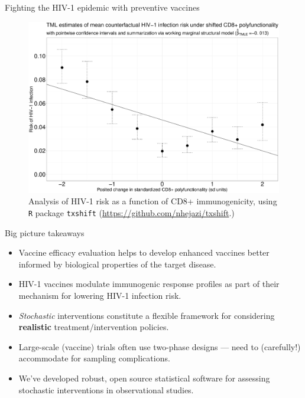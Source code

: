 \documentclass{beamer}
\begin{document}

\begin{frame}[c]{Fighting the HIV-1 epidemic with preventive vaccines}

\begin{figure}[H]
  \centering
  \includegraphics[scale=0.19]{cd8_msm_tmle_summary}
  \caption{
    Analysis of HIV-1 risk as a function of CD8+ immunogenicity, using
    \texttt{R} package \texttt{txshift}
    (\url{https://github.com/nhejazi/txshift}.)
  }
\end{figure}

\note{
}

\end{frame}


\begin{frame}[c]{Big picture takeaways}

\begin{center}
\begin{itemize}
  \itemsep8pt
  \item Vaccine efficacy evaluation helps to develop enhanced vaccines better
    informed by biological properties of the target disease.
  \item HIV-1 vaccines modulate immunogenic response profiles as part of their
    mechanism for lowering HIV-1 infection risk.
  \item \textit{Stochastic} interventions constitute a flexible framework for
    considering \textbf{realistic} treatment/intervention policies.
  \item Large-scale (vaccine) trials often use two-phase designs --- need to
    (carefully!) accommodate for sampling complications.
  \item We've developed robust, open source statistical software for assessing
    stochastic interventions in observational studies.
\end{itemize}
\end{center}

\note{
}

\end{frame}
\end{document}
